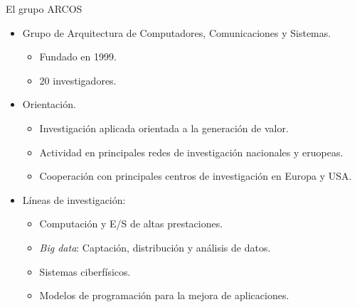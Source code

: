 \begin{frame}{El grupo ARCOS}
  \begin{itemize}
    \item Grupo de Arquitectura de Computadores, Comunicaciones y Sistemas.
      \begin{itemize}
        \item Fundado en 1999.
        \item 20 investigadores.
      \end{itemize}
    \item \pause Orientación.
      \begin{itemize}
        \item Investigación aplicada orientada a la generación de valor.
        \item Actividad en principales redes de investigación nacionales y eruopeas.
        \item Cooperación con principales centros de investigación en Europa y USA.
      \end{itemize}
    \item \pause Líneas de investigación:
      \begin{itemize}
        \item Computación y E/S de altas prestaciones.
        \item \emph{Big data}: Captación, distribución y análisis de datos.
        \item Sistemas ciberfísicos.
        \item Modelos de programación para la mejora de aplicaciones.
      \end{itemize}
  \end{itemize}
\end{frame}

